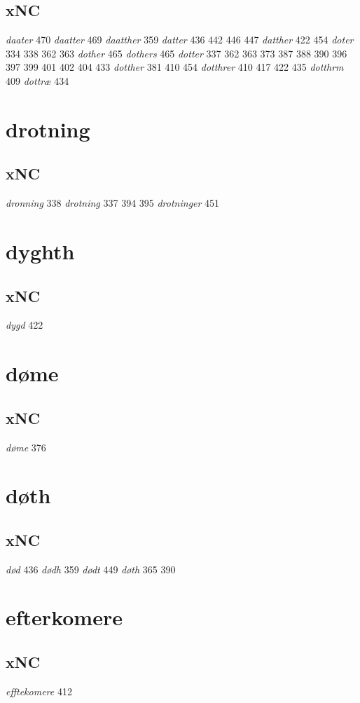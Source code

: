 \documentclass[a4paper,twocolumn]{article}
\begin{document}
\subsection{xNC}
\label{sec:org2e86a4c}
\emph{daater} 470 \emph{daatter} 469 \emph{daatther} 359 \emph{datter} 436 442 446 447 \emph{datther} 422 454 \emph{doter} 334 338 362 363 \emph{dother} 465 \emph{dothers} 465 \emph{dotter} 337 362 363 373 387 388 390 396 397 399 401 402 404 433 \emph{dotther} 381 410 454 \emph{dotthrer} 410 417 422 435 \emph{dotthrm} 409 \emph{dottræ} 434 
\section{drotning}
\label{sec:org3bf6203}
\subsection{xNC}
\label{sec:org9a5e4f6}
\emph{dronning} 338 \emph{drotning} 337 394 395 \emph{drotninger} 451 
\section{dyghth}
\label{sec:org803303e}
\subsection{xNC}
\label{sec:org66caf73}
\emph{dygd} 422 
\section{døme}
\label{sec:orgedceebe}
\subsection{xNC}
\label{sec:org574f230}
\emph{døme} 376 
\section{døth}
\label{sec:org21ac2c7}
\subsection{xNC}
\label{sec:orgf5eb7e9}
\emph{død} 436 \emph{dødh} 359 \emph{dødt} 449 \emph{døth} 365 390 
\section{efterkomere}
\label{sec:org26515f6}
\subsection{xNC}
\label{sec:orge82de9d}
\emph{efftekomere} 412 
\end{document}
